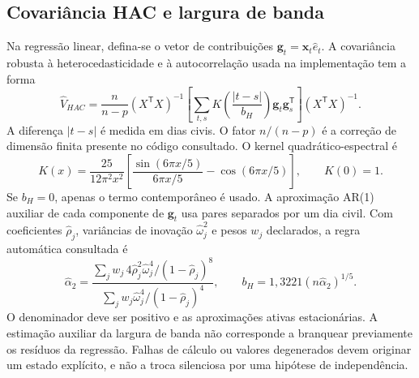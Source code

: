 \subsection{Covariância HAC e largura de banda}
\label{sec:mat-hac}
Na regressão linear, defina-se o vetor de contribuições $\boldsymbol g_t=\boldsymbol x_t\widehat e_t$. A covariância robusta à heterocedasticidade e à autocorrelação usada na implementação tem a forma\parencite{NeweyWest1987,Andrews1991}
\begin{equation}
\widehat V_{HAC}=\frac{n}{n-p}(X^{\mathsf T}X)^{-1}
\left[\sum_{t,s}K\!\left(\frac{|t-s|}{b_H}\right)
\boldsymbol g_t\boldsymbol g_s^{\mathsf T}\right](X^{\mathsf T}X)^{-1}.
\label{eq:mat-hac}
\end{equation}
A diferença $|t-s|$ é medida em dias civis. O fator $n/(n-p)$ é a correção de dimensão finita presente no código consultado. O kernel quadrático-espectral é
\begin{equation}
K(x)=\frac{25}{12\pi^2x^2}
\left[\frac{\sin(6\pi x/5)}{6\pi x/5}-\cos(6\pi x/5)\right],
\qquad K(0)=1.
\label{eq:mat-qs}
\end{equation}
Se $b_H=0$, apenas o termo contemporâneo é usado. A aproximação AR(1) auxiliar de cada componente de $\boldsymbol g_t$ usa pares separados por um dia civil. Com coeficientes $\widehat\rho_j$, variâncias de inovação $\widehat\omega_j^2$ e pesos $w_j$ declarados, a regra automática consultada é
\begin{equation}
\widehat\alpha_2=
\frac{\sum_jw_j\,4\widehat\rho_j^2\widehat\omega_j^4/(1-\widehat\rho_j)^8}
{\sum_jw_j\widehat\omega_j^4/(1-\widehat\rho_j)^4},
\qquad b_H=1{,}3221(n\widehat\alpha_2)^{1/5}.
\label{eq:mat-andrews}
\end{equation}
O denominador deve ser positivo e as aproximações ativas estacionárias. A estimação auxiliar da largura de banda não corresponde a branquear previamente os resíduos da regressão. Falhas de cálculo ou valores degenerados devem originar um estado explícito, e não a troca silenciosa por uma hipótese de independência.

